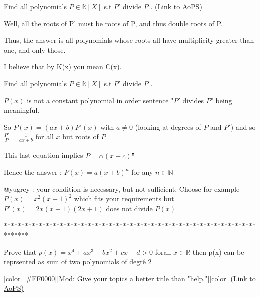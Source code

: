 \begin{problem}
	Find all polynomials $P\in \mathbb{K}[X]$ s.t $P'$ divide $P$ .
	\flushright \href{https://artofproblemsolving.com/community/c6h476428}{(Link to AoPS)}
\end{problem}



\begin{solution}
	Well, all the roots of P' must be roots of P, and thus double roots of P.

Thus, the answer is all polynomials whose roots all have multiplicity greater than one, and only those.

I believe that by K(x) you mean C(x).
\end{solution}



\begin{solution}
	\begin{tcolorbox}Find all polynomials $P\in \mathbb{K}[X]$ s.t $P'$ divide $P$ .\end{tcolorbox}
$P(x)$ is not a constant polynomial in order sentence "$P'$ divides $P$" being meaningful.

So $P(x)=(ax+b)P'(x)$ with $a\ne 0$ (looking at degrees of $P$ and $P'$) and so $\frac{P'}P=\frac 1{ax+b}$ for all $x$ but roots of $P$

This last equation implies $P=\alpha(x+c)^{\frac 1a}$

Hence the answer : $\boxed{P(x)=a(x+b)^n}$ for any $n\in\mathbb N$

@yugrey : your condition is necessary, but not sufficient. Choose for example $P(x)=x^2(x+1)^2$ which fits your requirements but $P'(x)=2x(x+1)(2x+1)$ does not divide $P(x)$
\end{solution}
*******************************************************************************
-------------------------------------------------------------------------------

\begin{problem}
	Prove that $p(x)=x^4+ax^3+bx^2+cx+d >0 $ forall $ x \in \mathbb{R}$ then p(x) can be reprsented as sum of two polynomials of degrê 2

[color=#FF0000][Mod: Give your topics a better title than "help."][\/color]
	\flushright \href{https://artofproblemsolving.com/community/c6h476649}{(Link to AoPS)}
\end{problem}



